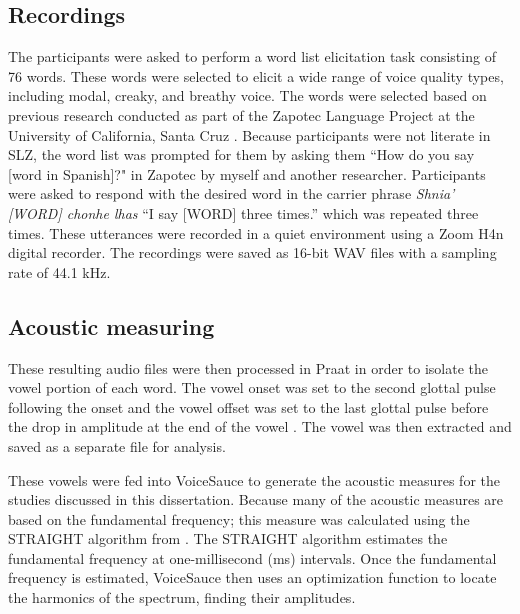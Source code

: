 \subsection{Recordings} \label{sec:acousticlandscape:recordings} 
The participants were asked to perform a word list elicitation task consisting of 76 words. These words were selected to elicit a wide range of voice quality types, including modal, creaky, and breathy voice. The words were selected based on previous research conducted as part of the Zapotec Language Project at the University of California, Santa Cruz \citep{ZapotecLanguageProject}. 
Because participants were not literate in SLZ, the word list was prompted for them by asking them ``How do you say [word in Spanish]?" in Zapotec by myself and another researcher. Participants were asked to respond with the desired word in the carrier phrase \textit{Shnia' [WORD] chonhe lhas} ``I say [WORD] three times.'' which was repeated three times. These utterances were recorded in a quiet environment using a Zoom H4n digital recorder. The recordings were saved as 16-bit WAV files with a sampling rate of 44.1 kHz.

\subsection{Acoustic measuring} \label{sec:acousticlandscape:analysis}
These resulting audio files were then processed in Praat in order to isolate the vowel portion of each word. The vowel onset was set to the second glottal pulse following the onset and the vowel offset was set to the last glottal pulse before the drop in amplitude at the end of the vowel \citep{garellekAcousticDiscriminabilityComplex2020}. The vowel was then extracted and saved as a separate file for analysis.

These vowels were fed into VoiceSauce \citep{shueVOICESAUCEProgramVoice2009} to generate the acoustic measures for the studies discussed in this dissertation. Because many of the acoustic measures are based on the fundamental frequency; this measure was calculated using the STRAIGHT algorithm from \citep{kawaharaInstantaneousfrequencybasedPitchExtraction1998}. The STRAIGHT algorithm estimates the fundamental frequency at one-millisecond (ms) intervals. Once the fundamental frequency is estimated, VoiceSauce then uses an optimization function to locate the harmonics of the spectrum, finding their amplitudes.


